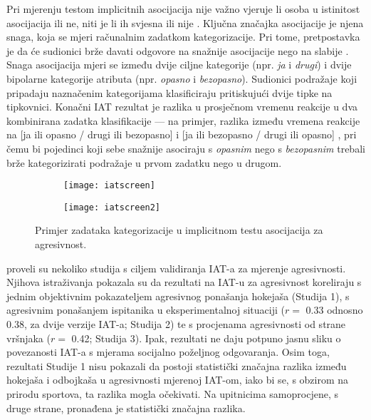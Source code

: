 \documentclass[a4paper, 12pt]{report}
\begin{document}
Pri mjerenju testom implicitnih asocijacija nije važno vjeruje li osoba 
u istinitost asocijacija ili ne, niti je li ih  svjesna ili nije \citep{wileyhandzgal}.
Ključna značajka asocijacije je njena snaga, koja se mjeri
računalnim zadatkom kategorizacije. Pri tome, pretpostavka je da će sudionici
brže davati odgovore na snažnije asocijacije nego na slabije
\citep{wileyhandzgal, greenwald1995implicit}. Snaga asocijacija  mjeri se između
dvije ciljne kategorije (npr. \emph{ja} i \emph{drugi}) i dvije bipolarne
kategorije atributa (npr. \emph{opasno} i \emph{bezopasno}).
Sudionici podražaje koji pripadaju naznačenim kategorijama klasificiraju pritiskujući dvije
tipke na tipkovnici. Konačni IAT rezultat je razlika u prosječnom vremenu
reakcije u dva kombinirana zadatka klasifikacije --- na primjer, razlika između
vremena reakcije na
[ja ili opasno / drugi ili bezopasno] i [ja ili bezopasno / drugi ili opasno]
\citep{richetin2008automatic}, pri čemu bi pojedinci koji sebe snažnije asociraju s
\emph{opasnim} nego s \emph{bezopasnim} trebali brže kategorizirati podražaje u
prvom zadatku nego u drugom.

\begin{figure}
    \centering
    \hspace*{-0.7cm}\begin{subfigure}{0.45\linewidth}
        \centering
        \texttt{[image: iatscreen]}
        \caption{}
        \end{subfigure}
        \hspace*{2em}
    \begin{subfigure}{0.45\linewidth}
        \centering
        \texttt{[image: iatscreen2]}
        \caption{}
        \end{subfigure}
        \vspace*{-0.6cm}
    \caption{Primjer zadataka kategorizacije u implicitnom testu asocijacija za
    agresivnost.}
\end{figure}

\citet{banse2015predicting} proveli su nekoliko studija s ciljem validiranja
IAT-a za mjerenje agresivnosti.
Njihova  istraživanja pokazala su da rezultati na IAT-u za
agresivnost koreliraju s jednim objektivnim pokazateljem agresivnog ponašanja
hokejaša (Studija 1), s agresivnim ponašanjem ispitanika u eksperimentalnoj situaciji ($r =$
0.33 odnosno 0.38, za dvije verzije IAT-a; Studija 2) te s procjenama
agresivnosti od strane vršnjaka ($r =$ 0.42; Studija 3).
Ipak, rezultati ne daju potpuno jasnu sliku o povezanosti IAT-a s mjerama
socijalno poželjnog odgovaranja. Osim toga, rezultati Studije 1 nisu pokazali da postoji
statistički značajna razlika između hokejaša i odbojkaša u agresivnosti mjerenoj
IAT-om, iako bi se, s obzirom na prirodu sportova, ta razlika mogla očekivati. 
Na upitnicima samoprocjene, s druge strane, pronađena je statistički značajna
razlika.
\end{document}

